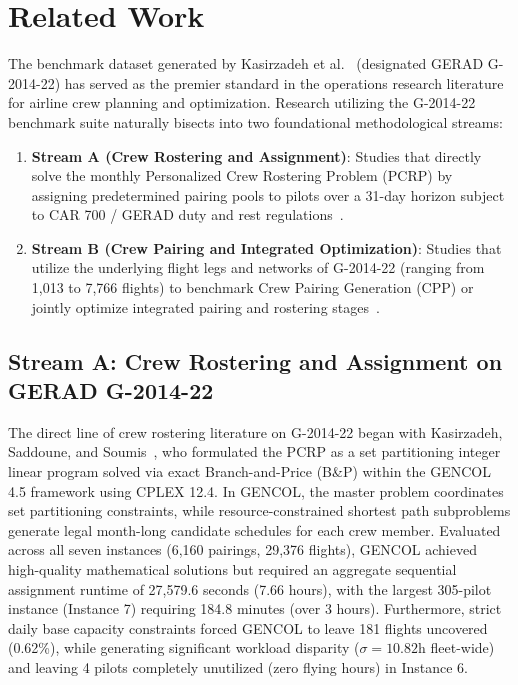 \documentclass[journal]{IEEEtran}
\begin{document}
\section{Related Work}
\label{sec:related_work}

The benchmark dataset generated by Kasirzadeh et al.~\cite{kasirzadeh2017} (designated GERAD G-2014-22) has served as the premier standard in the operations research literature for airline crew planning and optimization. Research utilizing the G-2014-22 benchmark suite naturally bisects into two foundational methodological streams:
\begin{enumerate}
    \item \textbf{Stream A (Crew Rostering and Assignment)}: Studies that directly solve the monthly Personalized Crew Rostering Problem (PCRP) by assigning predetermined pairing pools to pilots over a 31-day horizon subject to CAR 700 / GERAD duty and rest regulations~\cite{kasirzadeh2017,quesnel2022,racette2024,racette2025}.
    \item \textbf{Stream B (Crew Pairing and Integrated Optimization)}: Studies that utilize the underlying flight legs and networks of G-2014-22 (ranging from 1,013 to 7,766 flights) to benchmark Crew Pairing Generation (CPP) or jointly optimize integrated pairing and rostering stages~\cite{quesnel2017,zeighami2019,yaakoubi2020,morabit2021,tahir2023,quesnel2020}.
\end{enumerate}

\subsection{Stream A: Crew Rostering and Assignment on GERAD G-2014-22}
\label{sec:stream_a}

The direct line of crew rostering literature on G-2014-22 began with Kasirzadeh, Saddoune, and Soumis~\cite{kasirzadeh2017}, who formulated the PCRP as a set partitioning integer linear program solved via exact Branch-and-Price (B\&P) within the GENCOL 4.5 framework using CPLEX 12.4. In GENCOL, the master problem coordinates set partitioning constraints, while resource-constrained shortest path subproblems generate legal month-long candidate schedules for each crew member. Evaluated across all seven instances (6,160 pairings, 29,376 flights), GENCOL achieved high-quality mathematical solutions but required an aggregate sequential assignment runtime of 27,579.6 seconds (7.66 hours), with the largest 305-pilot instance (Instance 7) requiring 184.8 minutes (over 3 hours). Furthermore, strict daily base capacity constraints forced GENCOL to leave 181 flights uncovered (0.62\%), while generating significant workload disparity ($\sigma = 10.82$h fleet-wide) and leaving 4 pilots completely unutilized (zero flying hours) in Instance 6.
\end{document}

